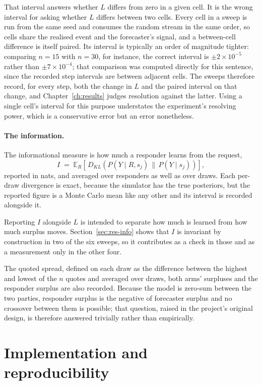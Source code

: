 That interval answers whether $L$ differs from zero in a given cell. It is the wrong
interval for asking whether $L$ differs between two cells. Every cell in a sweep is run from
the same seed and consumes the random stream in the same order, so cells share the realised
event and the forecaster's signal, and a between-cell difference is itself paired. Its
interval is typically an order of magnitude tighter: comparing $n=15$ with $n=30$, for
instance, the correct interval is $\pm 2\times10^{-5}$ rather than $\pm 7\times10^{-4}$;
that comparison was computed directly for this sentence, since the recorded step intervals
are between adjacent cells.
The sweeps therefore record, for every step, both the change in $L$ and the paired interval
on that change, and Chapter~\ref{ch:results} judges resolution against the latter. Using a
single cell's interval for this purpose understates the experiment's resolving power, which
is a conservative error but an error nonetheless.

\paragraph{The information.} The informational measure is how much a responder learns from
the request,
\[
I \;=\; \mathbb{E}_R\!\left[\, D_{KL}\!\left(P(Y \mid R, s_j) \,\big\|\, P(Y \mid s_j)\right) \right],
\]
reported in nats, and averaged over responders as well as over draws. Each per-draw
divergence is exact, because the simulator has the true posteriors, but the reported figure
is a Monte Carlo mean like any other and its interval is recorded alongside it.

Reporting $I$ alongside $L$ is intended to separate how much is learned from how much
surplus moves. Section~\ref{sec:res-info} shows that $I$ is invariant by construction in two
of the six sweeps, so it contributes as a check in those and as a measurement only in the
other four.

The quoted spread, defined on each draw as the difference between the highest and lowest
of the $n$ quotes and averaged over draws, both arms' surpluses and the responder surplus
are also recorded. Because
the model is zero-sum between the two parties, responder surplus is the negative of
forecaster surplus and no crossover between them is possible; that question, raised in the
project's original design, is therefore answered trivially rather than empirically.

\section{Implementation and reproducibility}
\label{sec:implementation}

